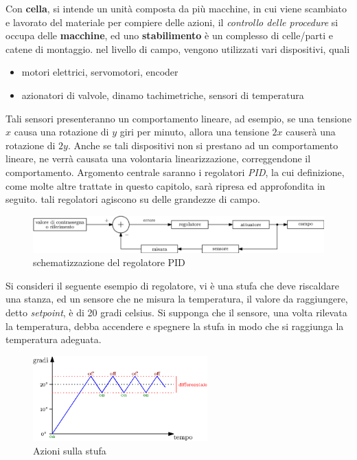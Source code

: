 \documentclass[10pt, letterpaper]{report}
\begin{document}
Con \textbf{cella}, si intende un unità composta da più macchine, in 
cui viene scambiato e lavorato del materiale per compiere delle azioni,
il \textit{controllo delle procedure} si occupa delle \textbf{macchine}, ed uno 
\textbf{stabilimento} è un complesso di celle/parti e catene 
di montaggio. nel livello di campo, vengono utilizzati vari dispositivi, 
quali\begin{itemize}
    \item motori elettrici, servomotori, encoder 
    \item azionatori di valvole, dinamo tachimetriche, sensori di temperatura
\end{itemize}
Tali sensori presenteranno un comportamento lineare, ad esempio, 
se una tensione $x$ causa una rotazione di $y$ giri per minuto, allora 
una tensione $2x$ causerà una  rotazione di $2y$. Anche se tali dispositivi 
non si prestano ad un comportamento lineare, ne verrà causata una volontaria 
linearizzazione, correggendone il comportamento.\acc 
Argomento centrale saranno i regolatori \textit{PID}, la cui definizione, 
come molte altre trattate in questo capitolo, sarà ripresa ed 
approfondita in seguito. tali regolatori agiscono su delle grandezze 
di campo.\begin{center}
    \begin{figure}[h!]
        \centering
        \includegraphics[width=1\textwidth ]{images/schemaPID.eps}
        \caption{schematizzazione del regolatore PID}
        \label{fig:schemaPID}
   \end{figure}
\end{center}
Si consideri il seguente esempio di regolatore, vi è una stufa che deve 
riscaldare una stanza, ed un sensore che ne misura la temperatura, il valore 
da raggiungere, detto \textit{setpoint}, è di 20 gradi celsius. Si supponga che il 
sensore, una volta rilevata la temperatura, debba accendere e spegnere la stufa 
in modo che si raggiunga la temperatura adeguata.
\begin{center}
    \begin{figure}[h!]
        \centering
        \includegraphics[width=0.6\textwidth ]{images/stufaEsempio.eps}
        \caption{Azioni sulla stufa}
        \label{fig:stufa}
   \end{figure} 
\end{center}
\end{document}
